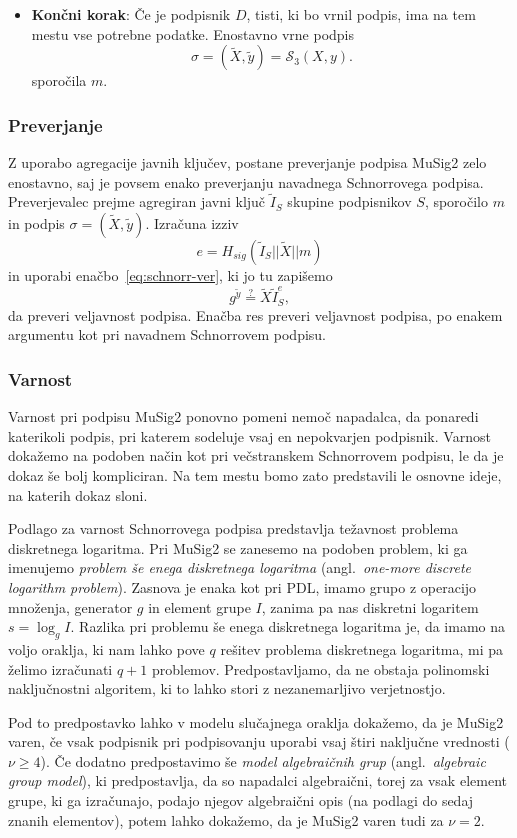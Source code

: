 \begin{itemize}
    \item \textbf{Končni korak}:
        Če je podpisnik $D$, tisti, ki bo vrnil podpis, ima na tem mestu vse potrebne podatke.
        Enostavno vrne podpis
        $$
        \sigma = (\tilde{X}, \tilde{y}) = \mathcal{S}_3(X, y).
        $$
        sporočila $m$.
\end{itemize}

\subsubsection{Preverjanje}
Z uporabo agregacije javnih ključev, postane preverjanje podpisa MuSig2 zelo enostavno, saj je
povsem enako preverjanju navadnega Schnorrovega podpisa. Preverjevalec prejme agregiran javni ključ
$\tilde{I}_S$ skupine podpisnikov $S$, sporočilo $m$ in podpis $\sigma = (\tilde{X}, \tilde{y})$.
Izračuna izziv
$$
e = H_{sig}(\tilde{I}_S || \tilde{X} || m)
$$ in uporabi enačbo~\eqref{eq:schnorr-ver}, ki jo tu zapišemo
$$
g^{\tilde{y}} \stackrel{?}{=} \tilde{X} \tilde{I}_S^e,
$$
da preveri veljavnost podpisa. Enačba res preveri veljavnost podpisa, po enakem argumentu kot pri
navadnem Schnorrovem podpisu.

\subsubsection{Varnost}
Varnost pri podpisu MuSig2 ponovno pomeni nemoč napadalca, da ponaredi katerikoli podpis, pri katerem
sodeluje vsaj en nepokvarjen podpisnik. Varnost dokažemo na podoben način kot pri večstranskem Schnorrovem
podpisu, le da je dokaz še bolj kompliciran. Na tem mestu bomo zato predstavili le osnovne ideje,
na katerih dokaz sloni.

Podlago za varnost Schnorrovega podpisa predstavlja težavnost problema diskretnega logaritma. Pri
MuSig2 se zanesemo na podoben problem, ki ga imenujemo \textit{problem še enega diskretnega logaritma}
(angl.\ \textit{one-more discrete logarithm problem}). Zasnova je enaka kot pri PDL, imamo grupo z
operacijo množenja, generator $g$ in element grupe $I$, zanima pa nas diskretni logaritem
$s = \log_g I$. Razlika pri problemu še enega diskretnega logaritma je, da imamo na voljo oraklja,
ki nam lahko pove $q$ rešitev problema diskretnega logaritma, mi pa želimo izračunati $q + 1$ problemov.
Predpostavljamo, da ne obstaja polinomski naključnostni algoritem, ki to lahko stori z nezanemarljivo
verjetnostjo.

Pod to predpostavko lahko v modelu slučajnega oraklja dokažemo, da je MuSig2 varen, če vsak podpisnik
pri podpisovanju uporabi vsaj štiri naključne vrednosti ($\nu \geq 4$). Če dodatno predpostavimo še
\textit{model algebraičnih grup} (angl.\ \textit{algebraic group model}), ki predpostavlja, da so
napadalci algebraični, torej za vsak element grupe, ki ga izračunajo, podajo njegov algebraični
opis (na podlagi do sedaj znanih elementov), potem lahko dokažemo, da je MuSig2 varen tudi za $\nu = 2$.

